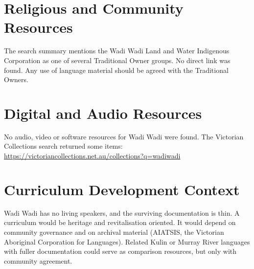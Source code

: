\documentclass[12pt]{article}
\begin{document}
\section{Religious and Community Resources}
The search summary mentions the Wadi Wadi Land and Water Indigenous Corporation as one of several Traditional Owner groups. No direct link was found. Any use of language material should be agreed with the Traditional Owners.

\section{Digital and Audio Resources}
No audio, video or software resources for Wadi Wadi were found. The Victorian Collections search returned some items: \url{https://victoriancollections.net.au/collections?q=wadiwadi}

\section{Curriculum Development Context}
Wadi Wadi has no living speakers, and the surviving documentation is thin. A curriculum would be heritage and revitalisation oriented. It would depend on community governance and on archival material (AIATSIS, the Victorian Aboriginal Corporation for Languages). Related Kulin or Murray River languages with fuller documentation could serve as comparison resources, but only with community agreement.
\end{document}
